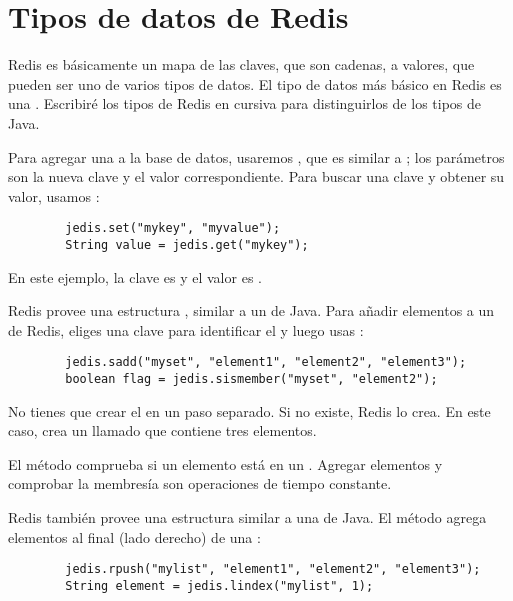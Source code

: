 \documentclass[12pt]{book}
\theoremstyle{exercise}
\begin{document}
\section{Tipos de datos de Redis}
\label{redis-data-types}

Redis es básicamente un mapa de las claves, que son cadenas, a
valores, que pueden ser uno de varios tipos de datos. El tipo de
datos más básico en Redis es una .  Escribiré los tipos
de Redis en cursiva para distinguirlos de los tipos de Java.

Para agregar una  a la base de datos,
usaremos , que es similar a ; los
parámetros son la nueva clave y el valor correspondiente. Para buscar
una clave y obtener su valor, usamos :

\begin{verbatim}
        jedis.set("mykey", "myvalue");
        String value = jedis.get("mykey");
\end{verbatim}

En este ejemplo, la clave es  y el valor es
.


Redis provee una estructura , similar a un
 de Java. Para añadir elementos a un  de Redis,
eliges una clave para identificar el  y luego usas
:

\begin{verbatim}
        jedis.sadd("myset", "element1", "element2", "element3");
        boolean flag = jedis.sismember("myset", "element2");
\end{verbatim}

No tienes que crear el  en un paso separado. Si no existe,
Redis lo crea. En este caso, crea un  llamado 
que contiene tres elementos.

El método  comprueba si un elemento está en un
. Agregar elementos y comprobar la membresía son operaciones
de tiempo constante.


Redis también provee una estructura  similar a una
 de Java. El método
 agrega elementos al final (lado derecho) de una
:

\begin{verbatim}
        jedis.rpush("mylist", "element1", "element2", "element3");
        String element = jedis.lindex("mylist", 1);
\end{verbatim}
\end{document}
